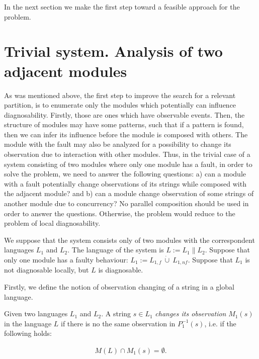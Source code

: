 In the next section we make the first step toward a feasible approach for the
problem.


\section{Trivial system. Analysis of two adjacent modules}

As was mentioned above, the first step to improve the search for a relevant
partition, is to enumerate only the modules which potentially can influence
diagnosability. Firstly, those are ones which have observable events. Then, the
structure of modules may have some patterns, such that if a pattern is found,
then we can infer its influence before the module is composed with others.
The module with the fault may also be analyzed for a possibility to change its
observation due to interaction with other modules. Thus, in the trivial case of
a system consisting of two modules where only one module has a fault, in order
to solve the problem, we need to answer the following questions: a) can a
module with a fault potentially change observations of its strings while
composed with the adjacent module? and b) can a module change observation of
some strings of another module due to concurrency? No parallel composition should be
used in order to answer the questions. Otherwise, the problem would reduce to
the problem of local diagnosability.

We suppose that the system consists only of two modules with the correspondent
languages $L_1$ and $L_2$. The language of the system is $L := L_1 \parallel
L_2$. Suppose that only one module has a faulty behaviour: $L_1 := L_{1,f}
~\dot{\cup}~ L_{1,nf}$.
Suppose that $L_1$ is not diagnosable locally, but $L$ is diagnosable.

Firstly, we define the notion of observation changing of a string in a global
language.
\begin{definition}Given two languages $L_1$ and $L_2$. A string $s \in
L_1$ \emph{changes its observation} $M_1(s)$ in the language $L$ if
there is no the same observation in $P_1^{-1}(s)$, i.e.
if the following holds:
\end{definition}
\begin{equation}
\label{def:obs}
	\begin{array}{l}
		M(L) \cap M_1(s) = \emptyset.
	\end{array}
\end{equation}

